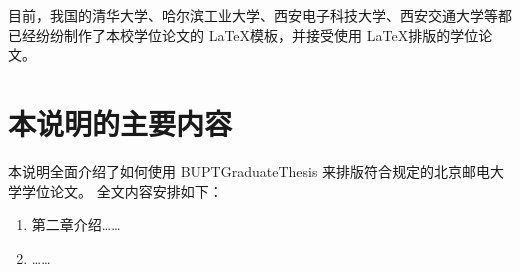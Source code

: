 目前，我国的清华大学、哈尔滨工业大学、西安电子科技大学、西安交通大学等都已经纷纷制作了本校学位论文的 \LaTeX 模板，并接受使用 \LaTeX 排版的学位论文。

\section{本说明的主要内容}
本说明全面介绍了如何使用 BUPTGraduateThesis 来排版符合\parencite{BUPT_Thesis_Format_2014}规定的北京邮电大学学位论文。
全文内容安排如下：

\begin{enumerate}
\item 第二章介绍……
\item ……
\end{enumerate}

\printbibliography[heading=subbibliography]

